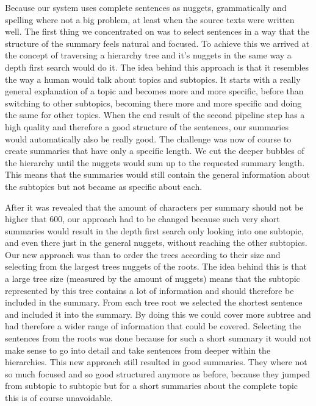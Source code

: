 Because our system uses complete sentences as nuggets, grammatically and spelling
where not a big problem, at least when the source texts were written well. The
first thing we concentrated on was to select sentences in a way that the structure
of the summary feels natural and focused. To achieve this we arrived at the
concept of traversing a hierarchy tree and it's nuggets in the same way a depth
first search would do it. The idea behind this approach is that it resembles the
way a human would talk about topics and subtopics. It starts with a really general
explanation of a topic and becomes more and more specific, before than switching
to other subtopics, becoming there more and more specific and doing the same for
other topics. When the end result of the second pipeline step has a high quality
and therefore a good structure of the sentences, our summaries would automatically
also be really good. The challenge was now of course to create summaries that
have only a specific length. We cut the deeper bubbles of the hierarchy until the
nuggets would sum up to the requested summary length. This means that the summaries
would still contain the general information about the subtopics but not became
as specific about each.

After it was revealed that the amount of characters per summary should not be
higher that 600, our approach had to be changed because such very short summaries
would result in the depth first search only looking into one subtopic, and even
there just in the general nuggets, without reaching the other subtopics. Our new
approach was than to order the trees according to their size and selecting from
the largest trees nuggets of the roots. The idea behind this is that a large tree
size (measured by the amount of nuggets) means that the subtopic represented by
this tree contains a lot of information and should therefore be included in the
summary. From each tree root we selected the shortest sentence and included it
into the summary. By doing this we could cover more subtree and had therefore a
wider range of information that could be covered. Selecting the sentences from
the roots was done because for such a short summary it would not make sense to
go into detail and take sentences from deeper within the hierarchies. This new
approach still resulted in good summaries. They where not so much focused and so
good structured anymore as before, because they jumped from subtopic to subtopic
but for a short summaries about the complete topic this is of course unavoidable.